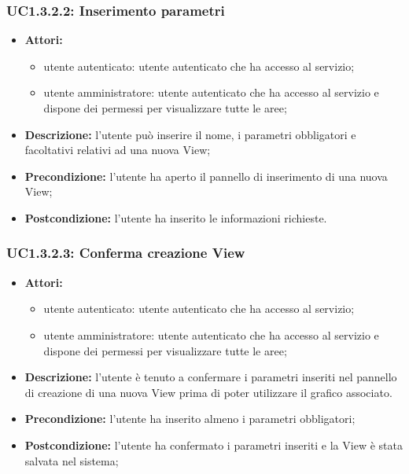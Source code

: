 \subsubsection{UC1.3.2.2: Inserimento parametri}

\begin{itemize}
    \item \textbf{Attori:}
    \begin{itemize}
    	\item utente autenticato: utente autenticato che ha accesso al servizio;
    	\item utente amministratore: utente autenticato che ha accesso al servizio e dispone dei permessi per visualizzare tutte le aree;
	\end{itemize}
    \item \textbf{Descrizione:} l'utente può inserire il nome, i parametri obbligatori e facoltativi relativi ad una nuova View\gloss{};
    \item \textbf{Precondizione:} l'utente ha aperto il pannello di inserimento di una nuova View\gloss{};
    \item \textbf{Postcondizione:} l'utente ha inserito le informazioni richieste.
\end{itemize}

\subsubsection{UC1.3.2.3: Conferma creazione View}

\begin{itemize}
    \item \textbf{Attori:}
    \begin{itemize}
    	\item utente autenticato: utente autenticato che ha accesso al servizio;
    	\item utente amministratore: utente autenticato che ha accesso al servizio e dispone dei permessi per visualizzare tutte le aree;
	\end{itemize}
    \item \textbf{Descrizione:} l'utente è tenuto a confermare i parametri inseriti nel pannello di creazione di una nuova View\gloss{} prima di poter utilizzare il grafico associato.
    \item \textbf{Precondizione:} l'utente ha inserito almeno i parametri obbligatori;
    \item \textbf{Postcondizione:} l'utente ha confermato i parametri inseriti e la View\gloss{} è stata salvata nel sistema;
\end{itemize}

